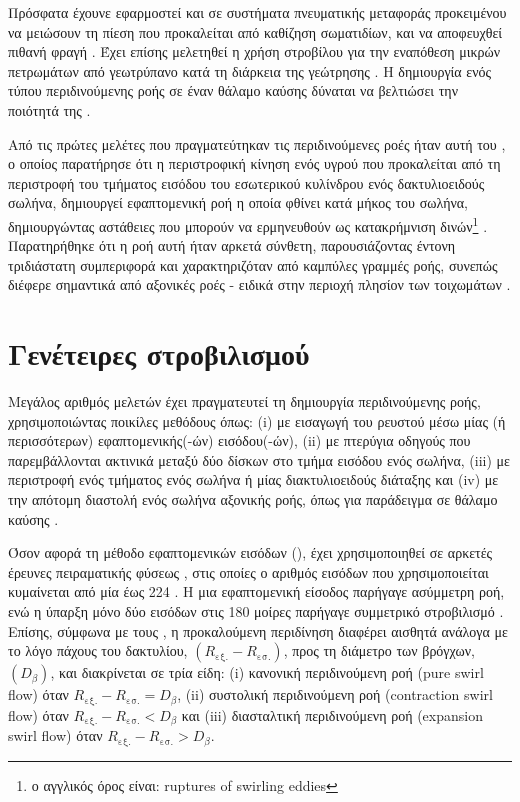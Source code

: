 Πρόσφατα έχουνε εφαρμοστεί και σε συστήματα πνευματικής μεταφοράς προκειμένου να μειώσουν τη πίεση που προκαλείται από καθίζηση σωματιδίων, και να αποφευχθεί πιθανή φραγή \parencites{1996_Li}{1994_Li}. Έχει επίσης μελετηθεί η χρήση στροβίλου για την εναπόθεση μικρών πετρωμάτων από γεωτρύπανο κατά τη διάρκεια της γεώτρησης \cite{2019_Qu}. Η δημιουργία ενός τύπου περιδινούμενης ροής σε έναν θάλαμο καύσης δύναται να βελτιώσει την ποιότητά της \cite{1996_Sheen}.

Από τις πρώτες μελέτες που πραγματεύτηκαν τις περιδινούμενες ροές ήταν αυτή του \citeauthor{1954_Talbot} \cite{1954_Talbot}, ο οποίος παρατήρησε ότι η περιστροφική κίνηση ενός υγρού που προκαλείται από τη περιστροφή του τμήματος εισόδου του εσωτερικού κυλίνδρου ενός δακτυλιοειδούς σωλήνα, δημιουργεί εφαπτομενική ροή η οποία φθίνει κατά μήκος του σωλήνα, δημιουργώντας αστάθειες που μπορούν να ερμηνευθούν ως κατακρήμνιση δινών\footnote{ο αγγλικός όρος είναι: ruptures of swirling eddies} \cite{1991_Bottaro}. Παρατηρήθηκε ότι η ροή αυτή ήταν αρκετά σύνθετη, παρουσιάζοντας έντονη τριδιάστατη συμπεριφορά και χαρακτηριζόταν από καμπύλες γραμμές ροής, συνεπώς διέφερε σημαντικά από αξονικές ροές - ειδικά στην περιοχή πλησίον των τοιχωμάτων \cite{1988_Yowakim}.

\section{Γενέτειρες στροβιλισμού}

\noindent Μεγάλος αριθμός μελετών έχει πραγματευτεί τη δημιουργία περιδινούμενης ροής, χρησιμοποιώντας ποικίλες μεθόδους όπως: (i) με εισαγωγή του ρευστού μέσω μίας (ή περισσότερων) εφαπτομενικής(-ών) εισόδου(-ών), (ii) με πτερύγια οδηγούς που παρεμβάλλονται ακτινικά μεταξύ δύο δίσκων στο τμήμα εισόδου ενός σωλήνα, (iii) με περιστροφή ενός τμήματος ενός σωλήνα ή μίας διακτυλιοειδούς διάταξης και (iv) με την απότομη διαστολή ενός σωλήνα αξονικής ροής, όπως για παράδειγμα σε θάλαμο καύσης \cite{1995_Hallett}.

Όσον αφορά τη μέθοδο εφαπτομενικών εισόδων (), έχει χρησιμοποιηθεί σε αρκετές έρευνες πειραματικής φύσεως \parencites{1961_Nissan}{1985_Shoukry}{2003_McClusky_CONF}{1990_Legentilhomme}{1991_Legentilhomme}{1993_Kumar}, στις οποίες ο αριθμός εισόδων που χρησιμοποιείται κυμαίνεται από μία \cite{1975_Hay} έως 224 \cite{1984_Sparrow}. Η μια εφαπτομενική είσοδος παρήγαγε ασύμμετρη ροή, ενώ η ύπαρξη μόνο δύο εισόδων στις 180 μοίρες παρήγαγε συμμετρικό στροβιλισμό \parencites{1961_Nissan}{1980_Ito}. Επίσης, σύμφωνα με τους \citeauthor{1991_Legentilhomme} \cite{1991_Legentilhomme}, η προκαλούμενη περιδίνηση διαφέρει αισθητά ανάλογα με το λόγο πάχους του δακτυλίου, $\left(R_{\text{εξ.}} - R_{\text{εσ.}}\right)$, προς τη διάμετρο των βρόγχων, $\left(D_{\beta}\right)$, και διακρίνεται σε τρία είδη: (i) κανονική περιδινούμενη ροή (pure swirl flow) όταν $R_{\text{εξ.}} - R_{\text{εσ.}} = D_{\beta}$, (ii) συστολική περιδινούμενη ροή (contraction swirl flow) όταν $R_{\text{εξ.}} - R_{\text{εσ.}} < D_{\beta}$  και (iii) διασταλτική περιδινούμενη ροή (expansion swirl flow) όταν $R_{\text{εξ.}} - R_{\text{εσ.}} > D_{\beta}$.
	
